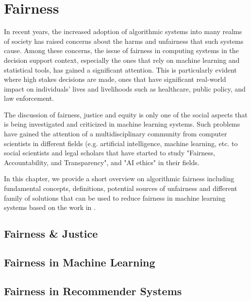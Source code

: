\chapter{Fairness}
\label{ch:fairness}

In recent years, the increased adoption of algorithmic systems into many realms of society has raised concerns about the harms and unfairness that such systems cause. Among these concerns, the issue of fairness in computing systems in the decision support context, especially the ones that rely on machine learning and statistical tools, has gained a significant attention\cite{mitchell2021algorithmic}. This is particularly evident where high stakes decisions are made, ones that have significant real-world impact on individuals’ lives and livelihoods such as healthcare, public policy, and law enforcement.

The discussion of fairness, justice and equity is only one of the social aspects that is being investigated and criticized in machine learning systems. Such problems have gained the attention of a multidisciplinary community from computer scientists in different fields (e.g. artificial intelligence, machine learning, etc. to social scientists and legal scholars that have started to study "Fairness, Accountability, and Transparency", and "AI ethics" in their fields.

In this chapter, we provide a short overview on algorithmic fairness including fundamental concepts, definitions, potential sources of unfairness and different family of solutions that can be used to reduce fairness in machine learning systems based on the work in \cite{mitchell2021algorithmic,barocas2016big,barocas2018fairness}.


\section{Fairness \& Justice}




\section{Fairness in Machine Learning}


\section{Fairness in Recommender Systems}


